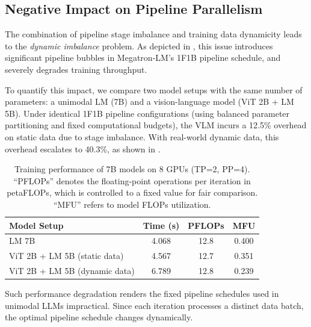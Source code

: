 \subsection{Negative Impact on Pipeline Parallelism}
\label{section:impact-on-pipeline-parallelism}

The combination of pipeline stage imbalance and training data dynamicity leads to the \emph{dynamic imbalance} problem.
As depicted in , this issue introduces significant pipeline bubbles in Megatron-LM's 1F1B pipeline schedule, and severely degrades training throughput.

To quantify this impact, we compare two model setups with the same number of parameters:
a unimodal LM (7B) and
a vision-language model (ViT 2B + LM 5B).
Under identical 1F1B pipeline configurations
(using balanced parameter partitioning and fixed computational budgets),
the VLM incurs a 12.5\% overhead on static data due to stage imbalance.
With real-world dynamic data, this overhead escalates to 40.3\%,
as shown in .

\begin{table}[t]
    \caption{
        Training performance of 7B models on 8 GPUs (TP=2, PP=4).
        ``PFLOPs'' denotes the floating-point operations per iteration in petaFLOPs,
        which is controlled to a fixed value for fair comparison.
        ``MFU'' refers to model FLOPs utilization.
    }
    \label{table:imbalanced-pipeline}
    \small
    \begin{tabular}{>{\raggedright}p{4cm}ccc}
    \toprule
    \textbf{Model Setup} & \textbf{Time (s)} & \textbf{PFLOPs} & \textbf{MFU} \\
    \midrule
    LM 7B & 4.068 & 12.8 & 0.400 \\
    ViT 2B + LM 5B (static data) & 4.567 & 12.7 & 0.351 \\
    ViT 2B + LM 5B (dynamic data) & 6.789 & 12.8 & 0.239 \\
    \bottomrule
    \end{tabular}
\end{table}

Such performance degradation renders the fixed pipeline schedules used in unimodal LLMs impractical.
Since each iteration processes a distinct data batch, the optimal pipeline schedule changes dynamically.


